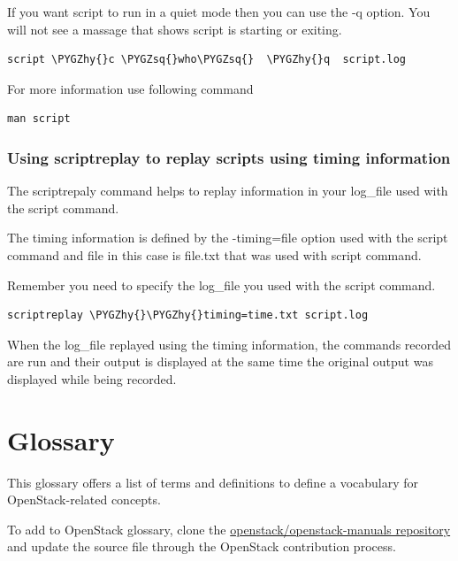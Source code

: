 \documentclass[letterpaper,10pt,english]{sphinxmanual}
\def\PYGZhy{\char`\-}
\def\PYGZsq{\char`\'}
\begin{document}
If you want script to run in a quiet mode then you can use the -q option. You will not see a massage that shows script is starting or exiting.

\begin{Verbatim}[commandchars=\\\{\}]
script \PYGZhy{}c \PYGZsq{}who\PYGZsq{}  \PYGZhy{}q  script.log
\end{Verbatim}

For more information use following command

\begin{Verbatim}[commandchars=\\\{\}]
man script
\end{Verbatim}


\subsection{Using scriptreplay to replay scripts using timing information}
\label{_source/things/screen:using-scriptreplay-to-replay-scripts-using-timing-information}
The scriptrepaly command helps to replay information in your log\_file used with the script command.

The timing information is defined by the -timing=file option used with the script command and file in this case is file.txt that was used with script command.

Remember you need to specify the log\_file you used with the script command.

\begin{Verbatim}[commandchars=\\\{\}]
scriptreplay \PYGZhy{}\PYGZhy{}timing=time.txt script.log
\end{Verbatim}

When the log\_file replayed using the timing information, the commands recorded are run and their output is displayed at the same time the original output was displayed while being recorded.


\chapter{Glossary}
\label{_source/glossary:glossary}\label{_source/glossary::doc}
This glossary offers a list of terms and definitions to define a
vocabulary for OpenStack-related concepts.

To add to OpenStack glossary, clone the \href{https://git.openstack.org/cgit/openstack/openstack-manuals}{openstack/openstack-manuals
repository} and
update the source file  through the
OpenStack contribution process.
\end{document}
